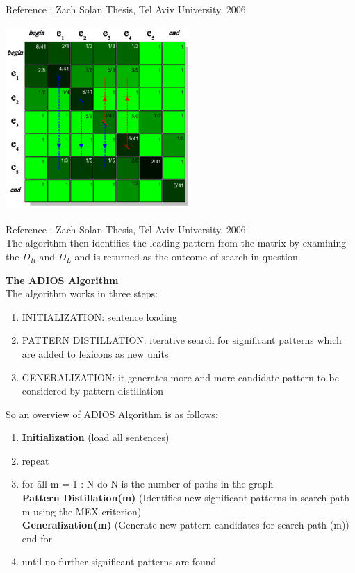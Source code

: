 \documentclass{article}
\begin{document}
\hfill {\scriptsize Reference : Zach Solan Thesis, Tel Aviv University, 2006}\\
\begin{center}\includegraphics[width=7cm,height=7cm]{a.eps}\end{center}

\hfill {\scriptsize Reference : Zach Solan Thesis, Tel Aviv University, 2006}\\

The algorithm then identifies the leading pattern from the matrix by examining the $D_R$ and $D_L$ and is returned as the outcome of search in question.

\textbf{The ADIOS Algorithm}
\\The algorithm works in three steps:
\begin{enumerate}
 \item INITIALIZATION: sentence loading
 \item PATTERN DISTILLATION: iterative search for significant patterns which are added to lexicons as new units
 \item GENERALIZATION: it generates more and more candidate pattern to be considered by pattern distillation
\end{enumerate} 
So an overview of ADIOS Algorithm is as follows:
\begin{enumerate}
\item {\bf Initialization} (load all sentences)
\item repeat
\item
\begin{tabbing}
 	for \= all m = 1 : N do {N is the number of paths in the graph}\\
	\> {\bf Pattern Distillation(m)} (Identifies new significant 	patterns in search-path m using the MEX criterion) 	\\
	\>	{\bf Generalization(m)} (Generate new pattern candidates for search-path (m))\\
	end for
\end{tabbing}
\item until no further significant patterns are found
\end{enumerate}
\end{document}

